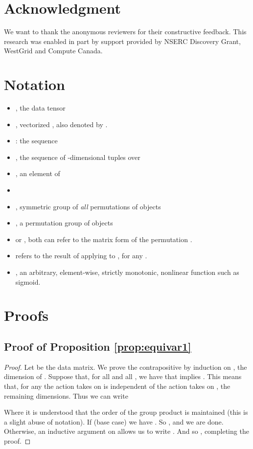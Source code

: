 \documentclass{article}
\theoremstyle{definition}
\newtheorem*{proof}{Proof}\newcommand{\fix}{\marginpar{FIX}}
\begin{document}
\section*{Acknowledgment}\label{sec:ack}
We want to thank the anonymous reviewers for their constructive feedback.
This research was enabled in part by support provided by NSERC Discovery Grant, WestGrid and Compute Canada.




\newpage
\clearpage
\appendix

\section{Notation}
\begin{itemize}
\item , the data tensor
\item , vectorized , also denoted by .
\item : the sequence 
\item , the sequence  of -dimensional tuples over 
\item , an element of 
\item 
\item , symmetric group of \textit{all} permutations of  objects
\item , a permutation group of  objects 
\item  or , both can refer to the matrix form of the permutation .
\item  refers to the result of applying  to , for any .
\item , an arbitrary, element-wise, strictly monotonic, nonlinear function such as sigmoid.
\end{itemize}

\section{Proofs}\label{app:proofs}

\subsection{Proof of Proposition \ref{prop:equivar1}}
\begin{proof}
Let  be the data matrix. We prove the contrapositive by induction on , the dimension of . Suppose that, for all  and all , we have that  implies . This means that, for any  the action  takes on  is independent of the action  takes on , the remaining dimensions. Thus we can write 
  
  Where it is understood that the order of the group product is maintained (this is a slight abuse of notation). If  (base case) we have . So , and we are done. Otherwise, an inductive argument on  allows us to write . And so , completing the proof.
\end{proof}
\end{document}
